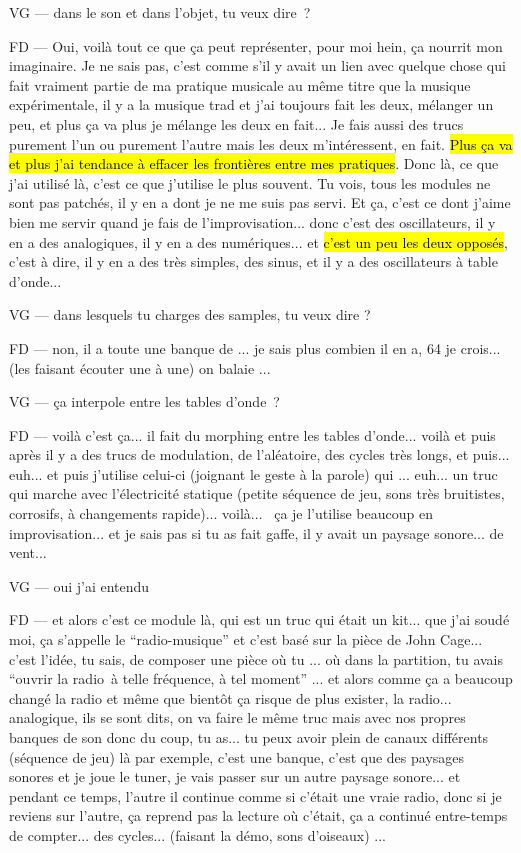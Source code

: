 VG — dans le son et dans l'objet, tu veux dire ? 

FD — Oui, voilà tout ce que ça peut représenter, pour moi hein, ça nourrit mon imaginaire. Je ne sais pas, c'est comme s'il y avait un lien avec quelque chose qui fait vraiment partie de ma pratique musicale au même titre que la musique expérimentale, il  y a la musique trad et j'ai toujours fait les deux, mélanger un peu, et plus ça va plus je mélange les deux en fait... Je fais aussi des trucs purement l'un ou purement l'autre mais les deux m'intéressent, en fait. \hl{Plus ça va et plus j'ai tendance à effacer les frontières entre mes pratiques}. Donc là, ce que j'ai utilisé là, c'est ce que j'utilise le plus souvent. Tu vois, tous les modules ne sont pas patchés, il y en a dont je ne me suis pas servi. Et ça, c'est ce dont j'aime bien me servir quand je fais de l'improvisation... donc c'est des oscillateurs, il y en a des analogiques, il y en a des numériques... et \hl{c'est un peu les deux opposés}, c'est à dire, il y en a des très simples, des sinus, et il y a des oscillateurs à table d'onde... 

VG — dans lesquels tu charges des samples, tu veux dire ? 

FD — non, il a toute une banque de ... je sais plus combien il en a, 64 je crois... (les faisant écouter une à une) on balaie ... 

VG — ça interpole entre les tables d'onde ? 

FD — voilà c'est ça... il fait du morphing entre les tables d'onde... voilà et puis après il y a des trucs de modulation, de l'aléatoire, des cycles très longs, et puis... euh... et puis j'utilise celui-ci (joignant le geste à la parole) qui ... euh... un truc qui marche avec l'électricité statique (petite séquence de jeu, sons très bruitistes, corrosifs, à changements rapide)... voilà...  ça je l'utilise beaucoup en improvisation... et je sais pas si tu as fait gaffe, il y avait un paysage sonore... de vent... 

VG — oui j'ai entendu 

FD — et alors c'est ce module là, qui est un truc qui était un kit... que j'ai soudé moi, ça s'appelle le ``radio-musique'' et c'est basé sur la pièce de John Cage... c'est l'idée, tu sais, de composer une pièce où tu ... où dans la partition, tu avais ``ouvrir la radio à telle fréquence, à tel moment'' ... et alors comme ça a beaucoup changé la radio et même que bientôt ça risque de plus exister, la radio... analogique, ils se sont dits, on va faire le même  truc mais avec nos propres banques de son donc du coup, tu as... tu peux avoir plein de canaux différents (séquence de jeu) là par exemple, c'est une banque, c'est que des paysages sonores et je joue le tuner, je vais passer sur un autre paysage sonore... et pendant ce temps, l'autre il continue comme si c'était une vraie radio, donc si je reviens sur  l'autre, ça reprend pas la lecture où c'était, ça a continué entre-temps de compter... des cycles... (faisant la démo, sons d'oiseaux) ... 

